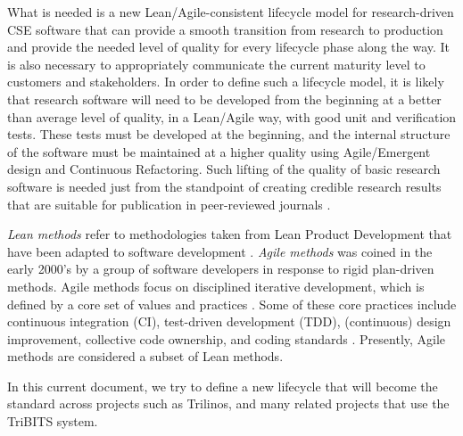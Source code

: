 \documentclass[11pt]{SANDreport}
\begin{document}
What is needed is a new Lean/Agile-consistent lifecycle model for
research-driven CSE software that can provide a smooth transition from
research to production and provide the needed level of quality for
every lifecycle phase along the way.  It is also necessary to
appropriately communicate the current maturity level to customers and
stakeholders.  In order to define such a lifecycle model, it is likely
that research software will need to be developed from the
beginning at a better than average level of quality, in a
Lean/Agile way, with good unit and verification tests.
These tests must be developed at the beginning, and the
internal structure of the software must be maintained at a
higher quality using Agile/Emergent 
design and Continuous Refactoring.
Such lifting of the quality of basic research software is needed just
from the standpoint of creating credible research results that are
suitable for publication in peer-reviewed journals
{}\cite{CompSciDemandsNewParadigm05,
ScientistsNightmareFiveRetractions2006}.

\textit{Lean methods} refer to methodologies taken
from Lean Product Development that have been adapted to software
development {}\cite{ImplementingLeanSoftwareDevelopment}.  
\textit{Agile methods} was coined in the early 2000's by a group of
software developers in response to rigid plan-driven methods.
Agile methods focus on disciplined iterative development, which is
defined by a core set of values and practices
{}\cite{AgileSoftwareDevelopment, Scrum, XP2}.  Some of these core
practices include continuous integration (CI), test-driven
development (TDD), (continuous) design improvement, collective code
ownership, and coding standards {}\cite{AgileSoftwareDevelopment,
XP2}.  Presently, Agile methods are considered a subset of Lean
methods.

In this current document, we try to define a new lifecycle that will
become the standard across projects such as Trilinos, and many
related projects that use the TriBITS system.
\end{document}
